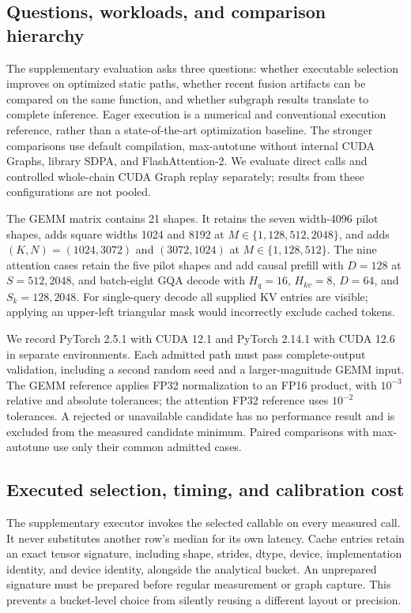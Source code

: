 \subsection{Questions, workloads, and comparison hierarchy}
\label{sec:supplement}

The supplementary evaluation asks three questions: whether executable selection improves on optimized static paths, whether recent fusion artifacts can be compared on the same function, and whether subgraph results translate to complete inference.
Eager execution is a numerical and conventional execution reference, rather than a state-of-the-art optimization baseline.
The stronger comparisons use default compilation, max-autotune without internal CUDA Graphs, library SDPA, and FlashAttention-2.
We evaluate direct calls and controlled whole-chain CUDA Graph replay separately; results from these configurations are not pooled.

The GEMM matrix contains 21 shapes.
It retains the seven width-4096 pilot shapes, adds square widths 1024 and 8192 at $M\in\{1,128,512,2048\}$, and adds $(K,N)=(1024,3072)$ and $(3072,1024)$ at $M\in\{1,128,512\}$.
The nine attention cases retain the five pilot shapes and add causal prefill with $D=128$ at $S=512,2048$, and batch-eight GQA decode with $H_q=16$, $H_{kv}=8$, $D=64$, and $S_k=128,2048$.
For single-query decode all supplied KV entries are visible; applying an upper-left triangular mask would incorrectly exclude cached tokens.

We record PyTorch 2.5.1 with CUDA 12.1 and PyTorch 2.14.1 with CUDA 12.6 in separate environments.
Each admitted path must pass complete-output validation, including a second random seed and a larger-magnitude GEMM input.
The GEMM reference applies FP32 normalization to an FP16 product, with $10^{-3}$ relative and absolute tolerances; the attention FP32 reference uses $10^{-2}$ tolerances.
A rejected or unavailable candidate has no performance result and is excluded from the measured candidate minimum.
Paired comparisons with max-autotune use only their common admitted cases.

\subsection{Executed selection, timing, and calibration cost}
\label{sec:executed}

The supplementary executor invokes the selected callable on every measured call.
It never substitutes another row's median for its own latency.
Cache entries retain an exact tensor signature, including shape, strides, dtype, device, implementation identity, and device identity, alongside the analytical bucket.
An unprepared signature must be prepared before regular measurement or graph capture.
This prevents a bucket-level choice from silently reusing a different layout or precision.

